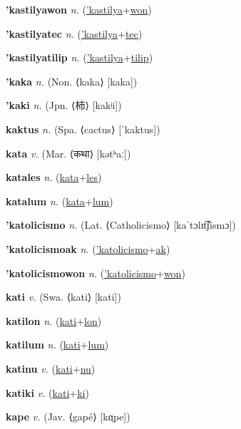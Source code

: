 \textbf{\hypertarget{'kastilyawon}{'kastilyawon}} \textit{n.} (\hyperlink{'kastilya}{'kastilya}+\allowbreak \hyperlink{won}{won})


\textbf{\hypertarget{'kastilyatec}{'kastilyatec}} \textit{n.} (\hyperlink{'kastilya}{'kastilya}+\allowbreak \hyperlink{tec}{tec})


\textbf{\hypertarget{'kastilyatilip}{'kastilyatilip}} \textit{n.} (\hyperlink{'kastilya}{'kastilya}+\allowbreak \hyperlink{tilip}{tilip})


\textbf{\hypertarget{'kaka}{'kaka}} \textit{n.} (Non. ⟨kaka⟩ [kaka])


\textbf{\hypertarget{'kaki}{'kaki}} \textit{n.} (Jpn. ⟨{\japanese{}柿}⟩ [kakʲi])


\textbf{\hypertarget{kaktus}{kaktus}} \textit{n.} (Spa. ⟨cactus⟩ [ˈkaktus])


\textbf{\hypertarget{kata}{kata}} \textit{v.} (Mar. ⟨{\devanagari{}कथा}⟩ [kətʰaː])


\textbf{\hypertarget{katales}{katales}} \textit{n.} (\hyperlink{kata}{kata}+\allowbreak \hyperlink{les}{les})


\textbf{\hypertarget{katalum}{katalum}} \textit{n.} (\hyperlink{kata}{kata}+\allowbreak \hyperlink{lum}{lum})


\textbf{\hypertarget{'katolicismo}{'katolicismo}} \textit{n.} (Lat. ⟨Catholicismo⟩ [kaˈtɔlɪt͡ʃismɔ])


\textbf{\hypertarget{'katolicismoak}{'katolicismoak}} \textit{n.} (\hyperlink{'katolicismo}{'katolicismo}+\allowbreak \hyperlink{ak}{ak})


\textbf{\hypertarget{'katolicismowon}{'katolicismowon}} \textit{n.} (\hyperlink{'katolicismo}{'katolicismo}+\allowbreak \hyperlink{won}{won})


\textbf{\hypertarget{kati}{kati}} \textit{v.} (Swa. ⟨kati⟩ [kati])


\textbf{\hypertarget{katilon}{katilon}} \textit{n.} (\hyperlink{kati}{kati}+\allowbreak \hyperlink{lon}{lon})


\textbf{\hypertarget{katilum}{katilum}} \textit{n.} (\hyperlink{kati}{kati}+\allowbreak \hyperlink{lum}{lum})


\textbf{\hypertarget{katinu}{katinu}} \textit{v.} (\hyperlink{kati}{kati}+\allowbreak \hyperlink{nu}{nu})


\textbf{\hypertarget{katiki}{katiki}} \textit{v.} (\hyperlink{kati}{kati}+\allowbreak \hyperlink{ki}{ki})


\textbf{\hypertarget{kape}{kape}} \textit{v.} (Jav. ⟨gapé⟩ [kɑ̤pe])



